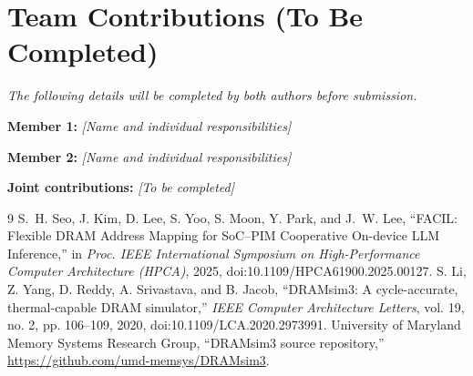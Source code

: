 \documentclass[conference,10pt]{IEEEtran}
\begin{document}
\section*{Team Contributions (To Be Completed)}
\noindent\textit{The following details will be completed by both authors
before submission.}\par\smallskip
\noindent\textbf{Member 1:} \textit{[Name and individual responsibilities]}\par
\noindent\textbf{Member 2:} \textit{[Name and individual responsibilities]}\par
\noindent\textbf{Joint contributions:} \textit{[To be completed]}\par

\balance
\begin{thebibliography}{9}
 S.~H. Seo, J. Kim, D. Lee, S. Yoo, S. Moon,
Y. Park, and J.~W. Lee, ``FACIL: Flexible DRAM Address Mapping for
SoC--PIM Cooperative On-device LLM Inference,'' in \emph{Proc.
IEEE International Symposium on High-Performance Computer
Architecture (HPCA)}, 2025, doi:10.1109/HPCA61900.2025.00127.
 S. Li, Z. Yang, D. Reddy, A. Srivastava,
and B. Jacob, ``DRAMsim3: A cycle-accurate, thermal-capable DRAM
simulator,'' \emph{IEEE Computer Architecture Letters}, vol. 19,
no. 2, pp. 106--109, 2020, doi:10.1109/LCA.2020.2973991.
 University of Maryland Memory Systems
Research Group, ``DRAMsim3 source repository,''
\url{https://github.com/umd-memsys/DRAMsim3}.
\end{thebibliography}
\end{document}
